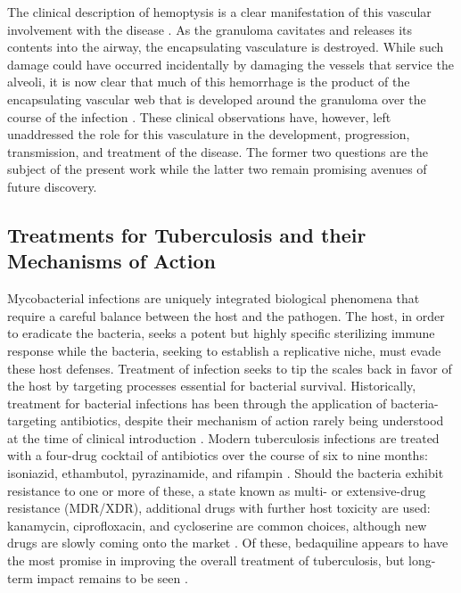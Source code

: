 The clinical description of hemoptysis is a clear manifestation of this vascular involvement with the disease \citep{Middleton1977, Souders1952, Turner2003a, Turner2003b}. As the granuloma cavitates and releases its contents into the airway, the encapsulating vasculature is destroyed. While such damage could have occurred incidentally by damaging the vessels that service the alveoli, it is now clear that much of this hemorrhage is the product of the encapsulating vascular web that is developed around the granuloma over the course of the infection \citep{Oehlers2015, Datta2015, Cudkowicz1952}. These clinical observations have, however, left unaddressed the role for this vasculature in the development, progression, transmission, and treatment of the disease. The former two questions are the subject of the present work while the latter two remain promising avenues of future discovery.

\subsection{Treatments for Tuberculosis and their Mechanisms of Action}\label{treatments}

Mycobacterial infections are uniquely integrated biological phenomena that require a careful balance between the host and the pathogen. The host, in order to eradicate the bacteria, seeks a potent but highly specific sterilizing immune response while the bacteria, seeking to establish a replicative niche, must evade these host defenses. Treatment of infection seeks to tip the scales back in favor of the host by targeting processes essential for bacterial survival. Historically, treatment for bacterial infections has been through the application of bacteria\hyp{}targeting antibiotics, despite their mechanism of action rarely being understood at the time of clinical introduction \citep{DAmbrosio2015, Osborne2013}. Modern tuberculosis infections are treated with a four\hyp{}drug cocktail of antibiotics over the course of six to nine months: isoniazid, ethambutol, pyrazinamide, and rifampin \citep{Dorman2021, Grace2019}. Should the bacteria exhibit resistance to one or more of these, a state known as multi\hyp{} or extensive\hyp{}drug resistance (MDR/XDR), additional drugs with further host toxicity are used: kanamycin, ciprofloxacin, and cycloserine are common choices, although new drugs are slowly coming onto the market \citep{Quenard2017, Jang2020, Nahid2019}. Of these, bedaquiline appears to have the most promise in improving the overall treatment of tuberculosis, but long\hyp{}term impact remains to be seen \citep{Mahajan2013, Pym2016, Furin2017}. 


